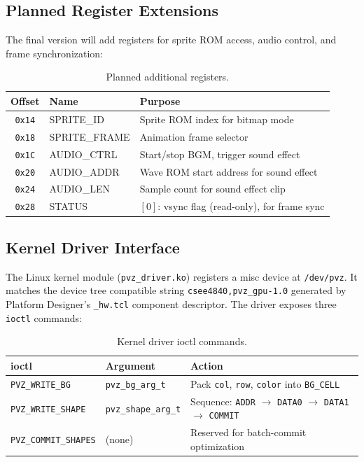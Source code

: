 \documentclass[11pt,letterpaper]{article}
\begin{document}
\subsection{Planned Register Extensions}

The final version will add registers for sprite ROM access, audio
control, and frame synchronization:

\begin{table}[H]
\centering
\caption{Planned additional registers.}
\label{tab:planned-regs}
\begin{tabular}{c l l}
\toprule
\textbf{Offset} & \textbf{Name} & \textbf{Purpose} \\
\midrule
\texttt{0x14} & SPRITE\_ID     & Sprite ROM index for bitmap mode \\
\texttt{0x18} & SPRITE\_FRAME  & Animation frame selector \\
\texttt{0x1C} & AUDIO\_CTRL    & Start/stop BGM, trigger sound effect \\
\texttt{0x20} & AUDIO\_ADDR    & Wave ROM start address for sound effect \\
\texttt{0x24} & AUDIO\_LEN     & Sample count for sound effect clip \\
\texttt{0x28} & STATUS         & $[0]$: vsync flag (read-only), for frame sync \\
\bottomrule
\end{tabular}
\end{table}

\subsection{Kernel Driver Interface}
\label{sec:driver}

The Linux kernel module (\texttt{pvz\_driver.ko}) registers a misc
device at \texttt{/dev/pvz}. It matches the device tree compatible
string \texttt{csee4840,pvz\_gpu-1.0} generated by Platform Designer's
\texttt{\_hw.tcl} component descriptor. The driver exposes three
\texttt{ioctl} commands:

\begin{table}[H]
\centering
\caption{Kernel driver ioctl commands.}
\label{tab:ioctls}
\begin{tabular}{l l l}
\toprule
\textbf{ioctl} & \textbf{Argument} & \textbf{Action} \\
\midrule
\texttt{PVZ\_WRITE\_BG}
  & \texttt{pvz\_bg\_arg\_t}
  & Pack \texttt{col}, \texttt{row}, \texttt{color} into \texttt{BG\_CELL} \\
\texttt{PVZ\_WRITE\_SHAPE}
  & \texttt{pvz\_shape\_arg\_t}
  & Sequence: \texttt{ADDR} $\to$ \texttt{DATA0} $\to$ \texttt{DATA1} $\to$ \texttt{COMMIT} \\
\texttt{PVZ\_COMMIT\_SHAPES}
  & (none)
  & Reserved for batch-commit optimization \\
\bottomrule
\end{tabular}
\end{table}
\end{document}
